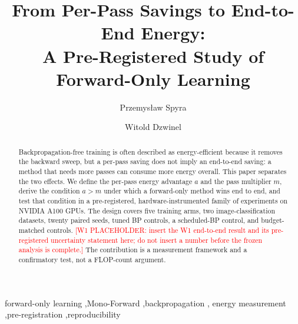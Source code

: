 \documentclass[preprint,12pt]{elsarticle}
\newcommand{\wone}[1]{\textcolor{red}{[W1 PLACEHOLDER: #1]}}
\begin{document}
\begin{frontmatter}

\title{From Per-Pass Savings to End-to-End Energy:\\
A Pre-Registered Study of Forward-Only Learning}

\author[a]{Przemys{\l}aw Spyra}
\author[a]{Witold Dzwinel}

\begin{abstract}
Backpropagation-free training is often described as energy-efficient because
it removes the backward sweep, but a per-pass saving does not imply an
end-to-end saving: a method that needs more passes can consume more energy
overall.  This paper separates the two effects.  We define the per-pass energy
advantage $a$ and the pass multiplier $m$, derive the condition $a>m$ under
which a forward-only method wins end to end, and test that condition in a
pre-registered, hardware-instrumented family of experiments on NVIDIA A100
GPUs.  The design covers five training arms, two image-classification
datasets, twenty paired seeds, tuned BP controls, a scheduled-BP control, and
budget-matched controls.  \wone{insert the W1 end-to-end result and its
pre-registered uncertainty statement here; do not insert a number before the
frozen analysis is complete.}  The contribution is a measurement framework and
a confirmatory test, not a FLOP-count argument.
\end{abstract}

\begin{keyword}
forward-only learning \sep Mono-Forward \sep backpropagation \sep
energy measurement \sep pre-registration \sep reproducibility
\end{keyword}

\end{frontmatter}

\end{document}
